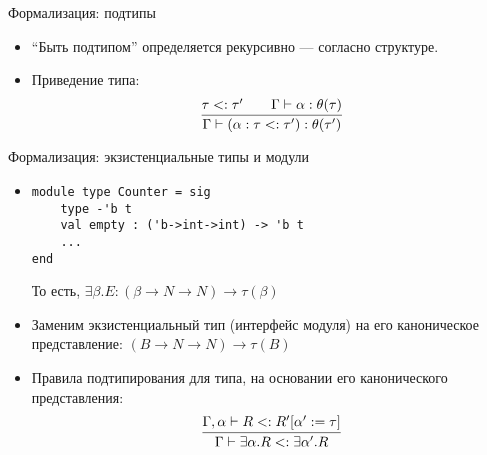 \documentclass[aspectratio=169,dvipsnames,usenames]{beamer}
\begin{document}
\begin{frame}{Формализация: подтипы}
\begin{itemize}
\item ``Быть подтипом'' определяется рекурсивно --- согласно структуре.
\item Приведение типа:
$$\infer{\Gamma\vdash(\alpha: \tau<:\tau'):\theta(\tau')}{\tau <: \tau'\quad\quad\Gamma\vdash\alpha:\theta(\tau)}$$
\end{itemize}
\end{frame}

\begin{frame}[fragile]{Формализация: экзистенциальные типы и модули}
\begin{itemize}
\item 
\begin{verbatim}
module type Counter = sig
    type -'b t
    val empty : ('b->int->int) -> 'b t
    ...
end
\end{verbatim}
То есть, $\exists \beta.E : (\beta\rightarrow N \rightarrow N) \rightarrow \tau(\beta)$
\item Заменим экзистенциальный тип (интерфейс модуля) на его каноническое представление:
$(B\rightarrow N \rightarrow N)\rightarrow \tau(B)$
\item Правила подтипирования для типа, на основании его канонического представления:
$$ \infer{\Gamma\vdash\exists\alpha.R <: \exists\alpha'.R}{\Gamma,\alpha\vdash R<: R'[\alpha':=\tau]}$$
\end{itemize}
\end{frame}
\end{document}
